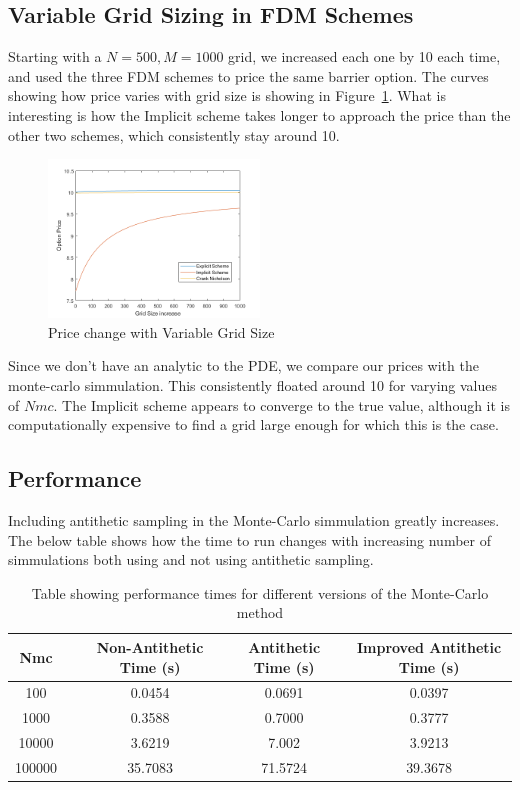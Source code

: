 \documentclass[11pt]{article}
\begin{document}
\subsection{Variable Grid Sizing in FDM Schemes}
Starting with a $N=500, M=1000$ grid, we increased each one by 10 each time, and used the three FDM schemes to price the same barrier option.
The curves showing how price varies with grid size is showing in Figure~\ref{gridsize}. What is interesting is how the Implicit scheme 
takes longer to approach the price than the other two schemes, which consistently stay around 10. 

\begin{figure}[h]
    \centering
    \includegraphics[width=0.5\textwidth]{gridtest.png}
    \caption{Price change with Variable Grid Size}
    \label{gridsize}
\end{figure}

Since we don't have an analytic to the PDE, we compare our prices with the monte-carlo simmulation. This consistently floated around 10 for 
varying values of $Nmc$. The Implicit scheme appears to converge to the true value, although it is computationally expensive to find a grid large 
enough for which this is the case. 


\subsection{Performance}
Including antithetic sampling in the Monte-Carlo simmulation greatly increases. The below table shows how the 
time to run changes with increasing number of simmulations both using and not using antithetic sampling.


\begin{table}[h]
\centering
\begin{tabular}{c c c c c}
    Nmc &  \vline & Non-Antithetic Time (s)& Antithetic Time (s) & Improved Antithetic Time (s) \\
    \hline
    100 &  \vline & 0.0454 & 0.0691 & 0.0397 \\
    1000 & \vline & 0.3588 & 0.7000 & 0.3777 \\
    10000 & \vline & 3.6219 & 7.002 & 3.9213 \\
    100000 & \vline & 35.7083 & 71.5724 & 39.3678 
\end{tabular}
\caption{Table showing performance times for different versions of the Monte-Carlo method}
\label{MCTable}
\end{table}
\end{document}
